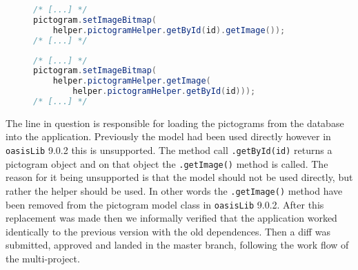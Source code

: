 \begin{description}
    \begin{figure} 
        \begin{lstlisting}[language=java, caption={Sequence with deprecated method call. }, label=lst:dep-seq-prev] 
/* [...] */ 
pictogram.setImageBitmap( 
    helper.pictogramHelper.getById(id).getImage()); 
/* [...] */ 
        \end{lstlisting} 
    \end{figure} 
    \begin{figure} 
        \begin{lstlisting}[language=java, caption={Sequence using the replacement code. }, label=lst:dep-seq-upd] 
/* [...] */ 
pictogram.setImageBitmap( 
    helper.pictogramHelper.getImage( 
        helper.pictogramHelper.getById(id))); 
/* [...] */ 
        \end{lstlisting} 
    \end{figure} 
    The line in question is responsible for loading the pictograms from the database into the application. 
     Previously the model had been used directly however in \texttt{oasisLib} 9.0.2 this is unsupported. 
    The method call \texttt{.getById(id)} returns a pictogram object and on that object the \texttt{.getImage()} method is called. 
    The reason for it being unsupported is that the model should not be used directly, but rather the helper should be used. 
    In other words the \texttt{.getImage()} method have been removed from the pictogram model class in \texttt{oasisLib} 9.0.2. 
     After this replacement was made then we informally verified that the application worked identically to the previous version with the old dependences. 
    Then a diff was submitted, approved and landed in the master branch, following the work flow of the multi-project. 
 \end{description}
 